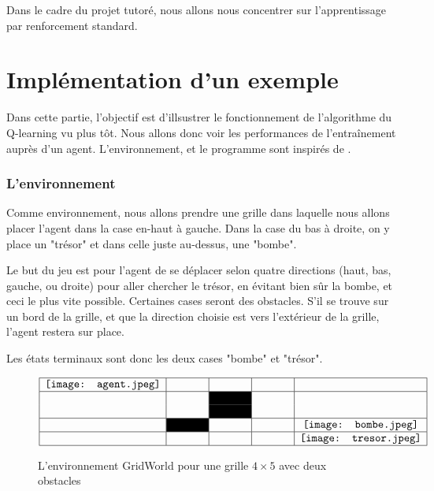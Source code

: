 Dans le cadre du projet tutoré, nous allons nous concentrer sur l'apprentissage par renforcement standard. 

\section{Implémentation d'un exemple}

Dans cette partie, l'objectif est d'illsustrer le fonctionnement de l'algorithme du Q-learning vu plus tôt. Nous allons donc voir les performances de l'entraînement auprès d'un agent. L'environnement, et le programme sont inspirés de \cite{gridW}.

\subsubsection*{L'environnement}

Comme environnement, nous allons prendre une grille dans laquelle nous allons placer l'agent dans la case en-haut à gauche. Dans la case du bas à droite, on y place un "trésor" et dans celle juste au-dessus, une "bombe". 

Le but du jeu est pour l'agent de se déplacer selon quatre directions (haut, bas, gauche, ou droite) pour aller chercher le trésor, en évitant bien sûr la bombe, et ceci le plus vite possible. Certaines cases seront des obstacles. S'il se trouve sur un bord de la grille, et que la direction choisie est vers l'extérieur de la grille, l'agent restera sur place.

Les états terminaux sont donc les deux cases "bombe" et "trésor". 

\begin{figure}[!h]
\centering
$$\begin{array}{|c|c|c|c|c|}
\hline
\texttt{[image: agent.jpeg]} & \hspace*{1cm} &  \hspace*{1cm}&  \hspace*{1cm} & \\
\hline
& & \cellcolor{black} & & \\
& & \cellcolor{black} & & \\
\hline
& \cellcolor{black} & & & \texttt{[image: bombe.jpeg]}\\
\hline
& & & & \texttt{[image: tresor.jpeg]} \\
\hline
\end{array}
$$
\caption{L'environnement GridWorld pour une grille $4 \times 5 $ avec deux obstacles}
\label{gridw}
\end{figure}


